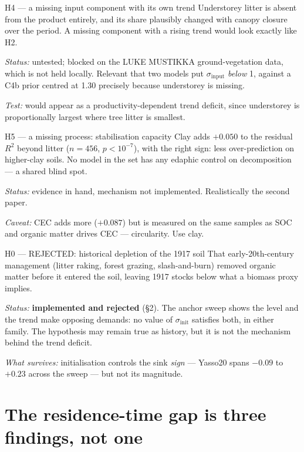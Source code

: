 \documentclass[11pt]{article}
\newcommand{\sinit}{\sigma_{\mathrm{init}}}
\newcommand{\sinput}{\sigma_{\mathrm{input}}}
\begin{document}
\begin{hyp}{H4 --- a missing input component with its own trend}
Understorey litter is absent from the product entirely, and its share plausibly changed with
canopy closure over the period. A missing component with a rising trend would look exactly like
H2.

\emph{Status:} untested; blocked on the LUKE MUSTIKKA ground-vegetation data, which is not held
locally. Relevant that two models put $\sinput$ \emph{below} 1, against a C4b prior centred at
1.30 precisely because understorey is missing.

\emph{Test:} would appear as a productivity-dependent trend deficit, since understorey is
proportionally largest where tree litter is smallest.
\end{hyp}

\begin{hyp}{H5 --- a missing process: stabilisation capacity}
Clay adds $+0.050$ to the residual $R^2$ beyond litter ($n=456$, $p<10^{-7}$), with the right
sign: less over-prediction on higher-clay soils. No model in the set has any edaphic control on
decomposition --- a shared blind spot.

\emph{Status:} evidence in hand, mechanism not implemented. Realistically the second paper.

\emph{Caveat:} CEC adds more ($+0.087$) but is measured on the same samples as SOC and organic
matter drives CEC --- circularity. Use clay.
\end{hyp}

\begin{hyp}{H0 --- REJECTED: historical depletion of the 1917 soil}
That early-20th-century management (litter raking, forest grazing, slash-and-burn) removed organic
matter before it entered the soil, leaving 1917 stocks below what a biomass proxy implies.

\emph{Status:} \textbf{implemented and rejected} (\S2). The anchor sweep shows the level and the
trend make opposing demands: no value of $\sinit$ satisfies both, in either family. The hypothesis
may remain true as history, but it is not the mechanism behind the trend deficit.

\emph{What survives:} initialisation controls the sink \emph{sign} --- Yasso20 spans $-0.09$ to
$+0.23$ across the sweep --- but not its magnitude.
\end{hyp}

\section{The residence-time gap is three findings, not one}\label{sec:mrtgap}
\end{document}
